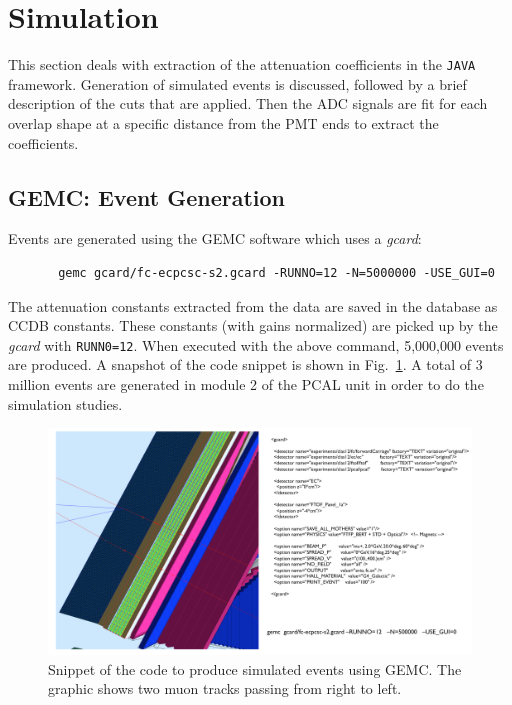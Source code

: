 \section{Simulation}
\label{Sec:simulation}
This section deals with extraction of the attenuation coefficients in the \texttt{JAVA} framework. Generation of simulated events is
discussed, followed by a brief description of the cuts that are applied. Then the ADC signals are fit for each overlap shape
at a specific distance from the PMT ends to extract the coefficients.

\FloatBarrier
\subsection{GEMC: Event Generation}
Events are generated using the GEMC software which uses a \textit{gcard}:
\begin{verbatim}
       gemc gcard/fc-ecpcsc-s2.gcard -RUNNO=12 -N=5000000 -USE_GUI=0
\end{verbatim}
The attenuation constants extracted from the data are saved in the database as CCDB constants. These constants 
(with gains normalized) are picked up by the \textit{gcard} with \texttt{RUNN0=12}. When executed with the above command, 
5,000,000 events are produced. A snapshot of the code snippet is shown in Fig.~\ref{fig:gcard}. A total of 3 million events are
generated in module 2 of the PCAL unit in order to do the simulation studies.

\begin{figure}[h]
    \centering
    \includegraphics[width= 7in, keepaspectratio = true]{gcard}
    \caption{Snippet of the code to produce simulated events using GEMC. The graphic shows two muon tracks passing from 
    right to left.}
    \label{fig:gcard}
\end{figure}
\FloatBarrier

